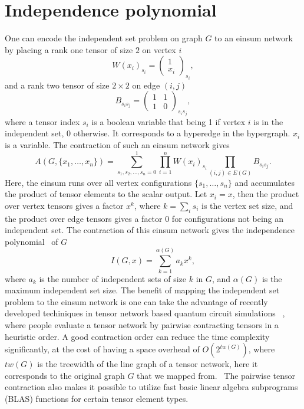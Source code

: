 \documentclass[review,onefignum,onetabnum]{siamart190516}
\newcommand{\<}{\langle}
\renewcommand{\>}{\rangle}
\begin{document}
\section{Independence polynomial}
One can encode the independent set problem on graph $G$ to an einsum network by placing a rank one tensor of size $2$ on vertex $i$
\begin{equation}
    W(x_i)_{s_i} = \left(\begin{matrix}
        1 \\
        x_i
    \end{matrix}\right)_{s_i},\label{eq:wtensor}
\end{equation}
and a rank two tensor of size $2 \times 2$ on edge $(i,j)$
\begin{equation}
    B_{s_i s_j} = \left(\begin{matrix}
        1  & 1\\
        1 & 0
    \end{matrix}\right)_{s_is_j},\label{eq:btensor}
\end{equation}
where a tensor index $s_i$ is a boolean variable that being 1 if vertex $i$ is in the independent set, 0 otherwise.
It corresponds to a hyperedge in the hypergraph.
$x_i$ is a variable.
The contraction of such an einsum network gives
\begin{equation}
    A(G, \{x_1,\ldots,x_n\}) = \sum\limits_{s_1, s_2, \ldots, s_n = 0}^{1} \prod\limits_{i=1}^n W(x_i)_{s_i} \prod\limits_{(i,j) \in E(G)} B_{s_i s_j}.
\end{equation}
Here, the einsum runs over all vertex configurations $\{s_1,\ldots,s_n\}$ and accumulates the product of tensor elements to the scalar output.
Let $x_i = x$, then the product over vertex tensors gives a factor $x^k$, where $k=\sum_i s_i$ is the vertex set size, 
and the product over edge tensors gives a factor $0$ for configurations not being an independent set.
The contraction of this einsum network gives the independence polynomial~\cite{Ferrin2014, Harvey2017} of $G$
\begin{equation}
I(G, x) = \sum_{k=1}^{\alpha(G)} a_k x^k,
\end{equation}
where $a_k$ is the number of independent sets of size $k$ in $G$, and $\alpha(G)$ is the maximum independent set size.
The benefit of mapping the independent set problem to the einsum network is one can take the advantage of recently developed techiniques in tensor network based quantum circuit simulations ~\cite{Gray2021,Pan2021},
where people evaluate a tensor network by pairwise contracting tensors in a heuristic order.
A good contraction order can reduce the time complexity significantly, at the cost of having a space overhead of $O(2^{tw(G)})$, where $tw(G)$ is the treewidth of the line graph of a tensor network, 
here it corresponds to the original graph $G$ that we mapped from.~\cite{Markov2008}
The pairwise tensor contraction also makes it possible to utilize fast basic linear algebra subprograms (BLAS) functions for certain tensor element types.
\end{document}
